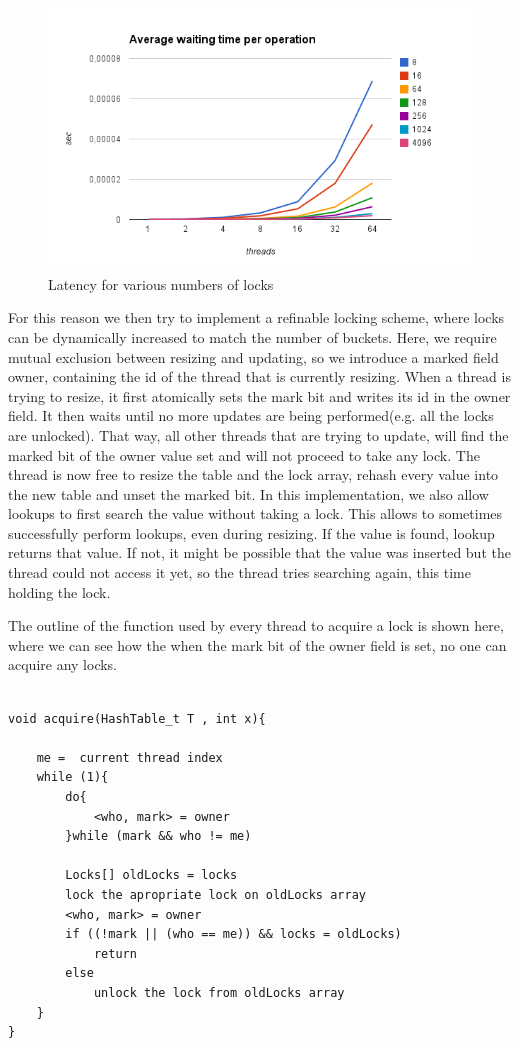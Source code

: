 \begin{figure}
 \centering
  \includegraphics[scale=0.7]{hashes_striped_latency.png}
\caption{Latency for various numbers of locks}
\label{hashes_striped_latency}
\end{figure}
For this reason we then try to implement a refinable locking scheme, where locks can be dynamically increased to match the number of buckets. Here, we require mutual exclusion between resizing and updating, so we introduce a marked field owner, containing the id of the thread that is currently resizing. When a thread is trying to resize, it first atomically sets the mark bit and writes its id in the owner field. It then waits until no more updates are being performed(e.g. all the locks are unlocked). That way, all other threads that are trying to update, will find the marked bit of the owner value set and will not proceed to take any lock. The thread is now free to resize the table and the lock array, rehash every value into the new table and unset the marked bit. In this implementation, we also allow lookups to first search the value without taking a lock. This allows to sometimes successfully perform lookups, even during resizing. If the value is found, lookup returns that value. If not, it might be possible that the value was inserted but the thread could not access it yet, so the thread tries searching again, this time holding the lock. 

The outline of the function used by every thread to acquire a lock is shown here, where we can see how the when the mark bit of the owner field is set, no one can acquire any locks.

\begin{lstlisting}[caption={Acquiring the lock for the refinable hash table }]

void acquire(HashTable_t T , int x){
	
	me =  current thread index
	while (1){
		do{
			<who, mark> = owner
		}while (mark && who != me)
		
		Locks[] oldLocks = locks
		lock the apropriate lock on oldLocks array
		<who, mark> = owner
		if ((!mark || (who == me)) && locks = oldLocks)
			return
		else 
			unlock the lock from oldLocks array 
	}
}

\end{lstlisting}

